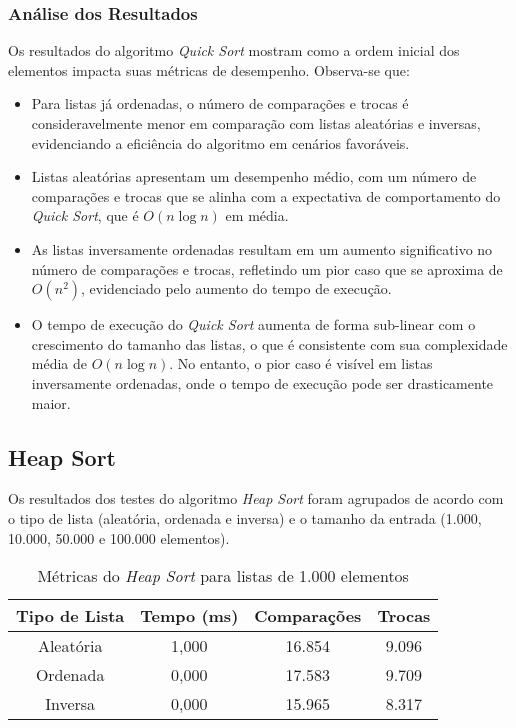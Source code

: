 \documentclass[a4paper,12pt]{article}
\begin{document}
\subsubsection{Análise dos Resultados}

Os resultados do algoritmo \textit{Quick Sort} mostram como a ordem inicial dos elementos impacta suas métricas de desempenho. Observa-se que:

\begin{itemize}
    \item Para listas já ordenadas, o número de comparações e trocas é consideravelmente menor em comparação com listas aleatórias e inversas, evidenciando a eficiência do algoritmo em cenários favoráveis.
    \item Listas aleatórias apresentam um desempenho médio, com um número de comparações e trocas que se alinha com a expectativa de comportamento do \textit{Quick Sort}, que é \(O(n \log n)\) em média.
    \item As listas inversamente ordenadas resultam em um aumento significativo no número de comparações e trocas, refletindo um pior caso que se aproxima de \(O(n^2)\), evidenciado pelo aumento do tempo de execução.
    \item O tempo de execução do \textit{Quick Sort} aumenta de forma sub-linear com o crescimento do tamanho das listas, o que é consistente com sua complexidade média de \(O(n \log n)\). No entanto, o pior caso é visível em listas inversamente ordenadas, onde o tempo de execução pode ser drasticamente maior.
\end{itemize}



\subsection{Heap Sort}

Os resultados dos testes do algoritmo \textit{Heap Sort} foram agrupados de acordo com o tipo de lista (aleatória, ordenada e inversa) e o tamanho da entrada (1.000, 10.000, 50.000 e 100.000 elementos).

\begin{table}[H]
\centering
\caption{Métricas do \textit{Heap Sort} para listas de 1.000 elementos}
\begin{tabular}{|c|c|c|c|}
\hline
\textbf{Tipo de Lista} & \textbf{Tempo (ms)} & \textbf{Comparações} & \textbf{Trocas} \\ \hline
Aleatória              & 1,000               & 16.854               & 9.096           \\ \hline
Ordenada               & 0,000               & 17.583               & 9.709           \\ \hline
Inversa                & 0,000               & 15.965               & 8.317           \\ \hline
\end{tabular}
\end{table}
\end{document}

